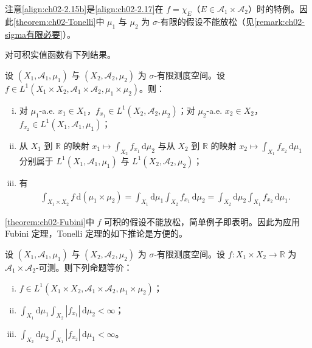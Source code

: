 \documentclass[../../main.tex]{subfiles}%
\begin{document}
\begin{remark}\label{remark:ch02-Tonelli条件}
\label{remark:ch02-截口注}
注意\eqref{align:ch02-2.15b}是\eqref{align:ch02-2.17}在 $f=\chi_E$（$E\in\mathscr A_1\times\mathscr A_2$）时的特例。因此\cref{theorem:ch02-Tonelli}中 $\mu_1$ 与 $\mu_2$ 为 $\sigma$-有限的假设不能放松（见\cref{remark:ch02-sigma有限必要}）。
\end{remark}

对可积实值函数有下列结果。

\begin{theorem}[Fubini]\label{theorem:ch02-Fubini}
设 $(X_1,\mathscr A_1,\mu_1)$ 与 $(X_2,\mathscr A_2,\mu_2)$ 为 $\sigma$-有限测度空间。设 $f\in L^1(X_1\times X_2,\mathscr A_1\times\mathscr A_2,\mu_1\times\mu_2)$。则：
\begin{enumerate}[(i)]
\item 对 $\mu_1$-a.e. $x_1\in X_1$，$f_{x_1}\in L^1(X_2,\mathscr A_2,\mu_2)$；对 $\mu_2$-a.e. $x_2\in X_2$，$f_{x_2}\in L^1(X_1,\mathscr A_1,\mu_1)$；
\item 从 $X_1$ 到 $\mathbb R$ 的映射 $x_1\mapsto\int_{X_2}f_{x_1}\,\mathrm{d}\mu_2$ 与从 $X_2$ 到 $\mathbb R$ 的映射 $x_2\mapsto\int_{X_1}f_{x_2}\,\mathrm{d}\mu_1$ 分别属于 $L^1(X_1,\mathscr A_1,\mu_1)$ 与 $L^1(X_2,\mathscr A_2,\mu_2)$；
\item 有
\begin{align}
\int_{X_1\times X_2}f\,\mathrm{d}(\mu_1\times\mu_2)
=\int_{X_1}\mathrm{d}\mu_1\int_{X_2}f_{x_1}\,\mathrm{d}\mu_2
=\int_{X_2}\mathrm{d}\mu_2\int_{X_1}f_{x_2}\,\mathrm{d}\mu_1. \label{align:ch02-2.18}
\end{align}
\end{enumerate}
\end{theorem}

\cref{theorem:ch02-Fubini}中 $f$ 可积的假设不能放松，简单例子即表明。因此为应用 Fubini 定理，Tonelli 定理的如下推论是方便的。

\begin{theorem}\label{theorem:ch02-Fubini判别}
设 $(X_1,\mathscr A_1,\mu_1)$ 与 $(X_2,\mathscr A_2,\mu_2)$ 为 $\sigma$-有限测度空间。设 $f:X_1\times X_2\to\mathbb R$ 为 $\mathscr A_1\times\mathscr A_2$-可测。则下列命题等价：
\begin{enumerate}[(i)]
\item $f\in L^1(X_1\times X_2,\mathscr A_1\times\mathscr A_2,\mu_1\times\mu_2)$；
\item $\int_{X_1}\mathrm{d}\mu_1\int_{X_2}|f_{x_1}|\,\mathrm{d}\mu_2<\infty$；
\item $\int_{X_2}\mathrm{d}\mu_2\int_{X_1}|f_{x_2}|\,\mathrm{d}\mu_1<\infty$。
\end{enumerate}
\end{theorem}
\end{document}
